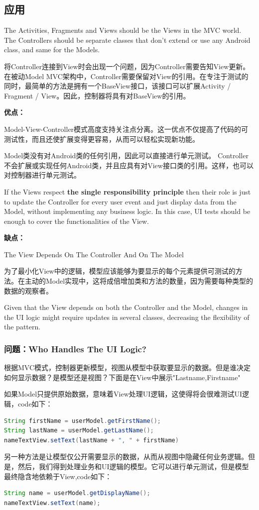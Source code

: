\documentclass[a4paper,12pt]{ctexart}
\begin{document}
	\subsection{应用}
	 The Activities, Fragments and Views should be the Views in the MVC world. The Controllers should be separate classes that don’t extend or use any Android class, and same for the Models.
	 \par 将Controller连接到View时会出现一个问题，因为Controller需要告知View更新。在被动Model MVC架构中，Controller需要保留对View的引用。在专注于测试的同时，最简单的方法是拥有一个BaseView接口，该接口可以扩展Activity / Fragment / View。因此，控制器将具有对BaseView的引用。
	 \par\noindent\textbf{优点：}
	 \par Model-View-Controller模式高度支持关注点分离。这一优点不仅提高了代码的可测试性，而且还使扩展变得更容易，从而可以轻松实现新功能。
	 \par Model类没有对Android类的任何引用，因此可以直接进行单元测试。 Controller不会扩展或实现任何Android类，并且应具有对View接口类的引用。这样，也可以对控制器进行单元测试。
	 \par If the Views respect \textbf{the single responsibility principle} then their role is just to update the Controller for every user event and just display data from the Model, without implementing any business logic. In this case, UI tests should be enough to cover the functionalities of the View.
	 \par\noindent\textbf{缺点：}
	 \par The View Depends On The Controller And On The Model
	 \par 为了最小化View中的逻辑，模型应该能够为要显示的每个元素提供可测试的方法。在主动的Model实现中，这将成倍增加类和方法的数量，因为需要每种类型的数据的观察者。
	 \par Given that the View depends on both the Controller and the Model, changes in the UI logic might require updates in several classes, decreasing the flexibility of the pattern.
	 \subsubsection{问题：Who Handles The UI Logic?}
	 根据MVC模式，控制器更新模型，视图从模型中获取要显示的数据。但是谁决定如何显示数据？是模型还是视图？下面是在View中展示"Lastname,Firstname"
	 \par 如果Model只提供原始数据，意味着View处理UI逻辑，这使得将会很难测试UI逻辑，code如下：
	 \begin{lstlisting}[language=Java,morekeywords={String}]
String firstName = userModel.getFirstName(); 
String lastName = userModel.getLastName(); 
nameTextView.setText(lastName + ", " + firstName)
	 \end{lstlisting}
	 \par 另一种方法是让模型仅公开需要显示的数据，从而从视图中隐藏任何业务逻辑。但是，然后，我们得到处理业务和UI逻辑的模型。它可以进行单元测试，但是模型最终隐含地依赖于View,code如下：
	 \begin{lstlisting}[language=Java,morekeywords={String}]
String name = userModel.getDisplayName(); 
nameTextView.setText(name);
	 \end{lstlisting}
\end{document}
